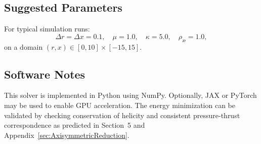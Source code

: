 \documentclass[preprint,notitlepage]{revtex4-2}
\begin{document}
        \subsection*{Suggested Parameters}
        For typical simulation runs:
        \[
            \Delta r = \Delta x = 0.1, \quad \mu = 1.0, \quad \kappa = 5.0, \quad \rho_{\text{\ae}} = 1.0,
        \]
        on a domain $(r,x) \in [0,10] \times [-15,15]$.

        \subsection*{Software Notes}
        This solver is implemented in Python using NumPy. Optionally, JAX or PyTorch may be used to enable GPU acceleration. The energy minimization can be validated by checking conservation of helicity and consistent pressure-thrust correspondence as predicted in Section~5 and Appendix~\ref{sec:AxisymmetricReduction}.




\end{document}
